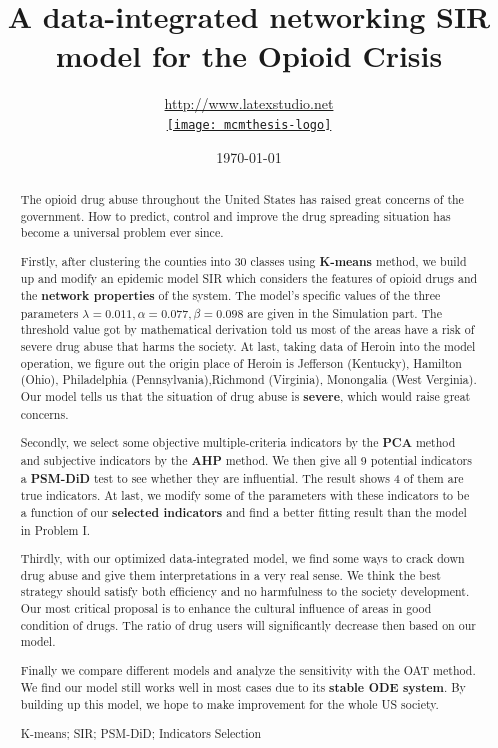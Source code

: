 \documentclass{mcmthesis}
\title{A data-integrated networking SIR model for the Opioid Crisis}
\author{\url{http://www.latexstudio.net}\\[3pt]  \href{http://www.latexstudio.net/}
  {\texttt{[image: mcmthesis-logo]}}}
\date{\today}
\begin{document}
\begin{abstract}
The opioid drug abuse throughout the United States has raised great concerns of the government. How to predict, control and improve the drug spreading situation has become a universal problem ever since. 

Firstly, after clustering the counties into 30 classes using \textbf{K-means} method, we build up and modify an epidemic model SIR which considers the features of opioid drugs and the \textbf{network properties} of the system. The model's specific values of the three parameters $\lambda=0.011, \alpha=0.077, \beta=0.098$ are given in the Simulation part. The threshold value got by mathematical derivation told us most of the areas have a risk of severe drug abuse that harms the society. At last, taking data of Heroin into the model operation, we figure out the origin place of Heroin is Jefferson (Kentucky), Hamilton (Ohio), Philadelphia (Pennsylvania),Richmond (Virginia), Monongalia  (West Verginia). Our model tells us that the situation of drug abuse is \textbf{severe}, which would raise great concerns.

Secondly, we select some objective multiple-criteria indicators by the \textbf{PCA} method and subjective indicators by the \textbf{AHP} method. We then give all 9 potential indicators a \textbf{PSM-DiD} test to see whether they are influential. The result shows 4 of them are true indicators. At last, we modify some of the parameters with these indicators to be a function of our \textbf{selected indicators} and find a better fitting result than the model in Problem I.

Thirdly, with our optimized data-integrated model, we find some ways to crack down drug abuse and give them interpretations in a very real sense. We think the best strategy should satisfy both efficiency and no harmfulness to the society development. Our most critical proposal is to enhance the cultural influence of areas in good condition of drugs. The ratio of drug users will significantly decrease then based on our model.

Finally we compare different models and analyze the sensitivity with the OAT method. We find our model still works well in most cases due to its \textbf{stable ODE system}. By building up this model, we hope to make improvement for the whole US society.
\begin{keywords}
K-means; SIR; PSM-DiD; Indicators Selection
\end{keywords}
\end{abstract}
\maketitle
\end{document}
